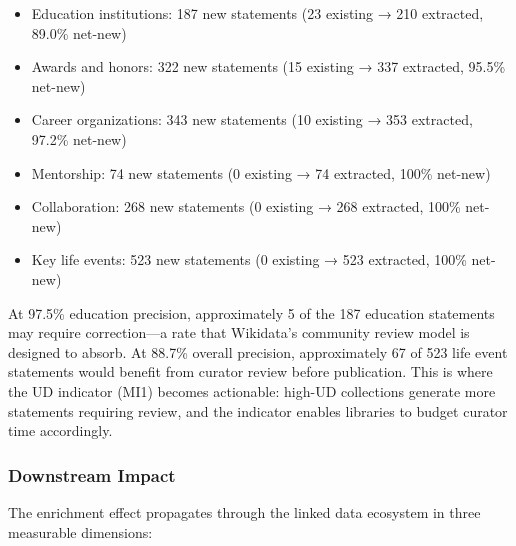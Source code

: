 \documentclass[review]{elsarticle}
\begin{document}
\begin{itemize}[leftmargin=*]
    \item Education institutions: 187 new statements (23 existing → 210 extracted, 89.0\% net-new)
    \item Awards and honors: 322 new statements (15 existing → 337 extracted, 95.5\% net-new)
    \item Career organizations: 343 new statements (10 existing → 353 extracted, 97.2\% net-new)
    \item Mentorship: 74 new statements (0 existing → 74 extracted, 100\% net-new)
    \item Collaboration: 268 new statements (0 existing → 268 extracted, 100\% net-new)
    \item Key life events: 523 new statements (0 existing → 523 extracted, 100\% net-new)
\end{itemize}

At 97.5\% education precision, approximately 5 of the 187 education statements may require correction—a rate that Wikidata's community review model is designed to absorb. At 88.7\% overall precision, approximately 67 of 523 life event statements would benefit from curator review before publication. This is where the UD indicator (MI1) becomes actionable: high-UD collections generate more statements requiring review, and the indicator enables libraries to budget curator time accordingly.

\subsubsection{Downstream Impact}

The enrichment effect propagates through the linked data ecosystem in three measurable dimensions:
\end{document}
